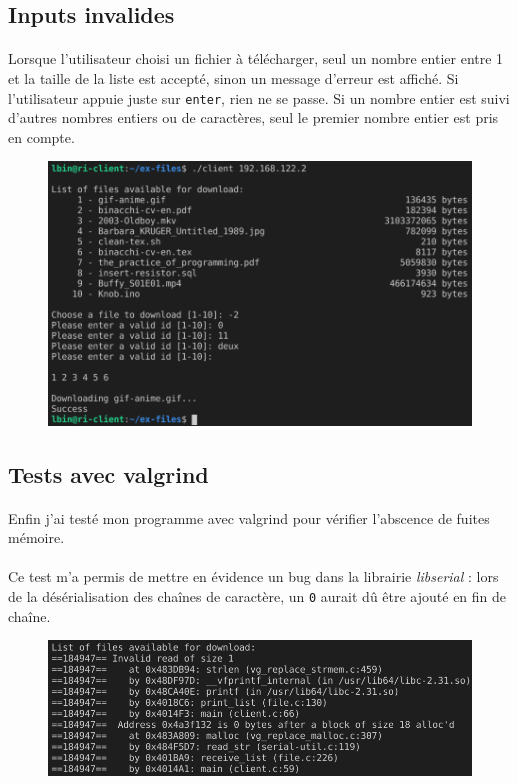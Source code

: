 \documentclass{article}
\begin{document}
    \subsection{Inputs invalides}
    \paragraph{}
    Lorsque l'utilisateur choisi un fichier à télécharger, seul un nombre entier entre 1 et la taille de la liste est accepté, sinon un message d'erreur est affiché. Si l'utilisateur appuie juste sur \texttt{enter}, rien ne se passe. Si un nombre entier est suivi d'autres nombres entiers ou de caractères, seul le premier nombre entier est pris en compte.
    \begin{figure}[H]
        \centering
        \includegraphics[width=.8\textwidth]{./screenshots/test-invalid-inputs.png}
    \end{figure}

    \newpage
    \subsection{Tests avec valgrind}
    \paragraph{}
    Enfin j'ai testé mon programme avec valgrind pour vérifier l'abscence de fuites mémoire.

    \paragraph{}
    Ce test m'a permis de mettre en évidence un bug dans la librairie \emph{libserial} : lors de la désérialisation des chaînes de caractère, un \texttt{0} aurait dû être ajouté en fin de chaîne.
    \begin{figure}[H]
        \centering
        \includegraphics[width=.7\textwidth]{./screenshots/test-valgrind.png}
    \end{figure}
\end{document}
